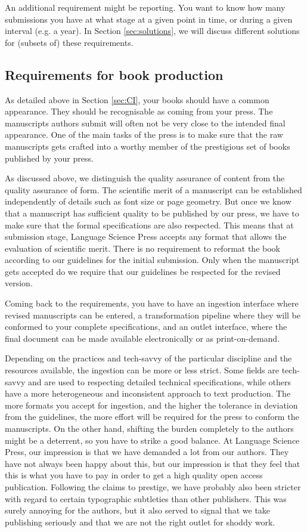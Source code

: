 \documentclass[nonflat,modfonts,output=book] {langsci/langscibook}
\begin{document}
An additional requirement might be reporting. You want to know how many submissions you have at what stage at a given point in time, or during a given interval (e.g. a year). In Section \ref{sec:solutions}, we will discuss different solutions for (subsets of) these requirements. 
 
 
\subsection{Requirements for book production}
As detailed above in Section \ref{sec:CI}, your books should have a common appearance. They should be recognisable as coming from your press. The manuscripts authors submit will often not be very close to the intended final appearance. One of the main tasks of the press is to make sure that the raw manuscripts gets crafted into a worthy member of the prestigious set of books published by your press. 

As discussed above, we distinguish the quality assurance of content from the quality assurance of form. The scientific merit of a manuscript can be established independently of details such as font size or page geometry. But once we know that a manuscript has sufficient quality to be published by our press, we have to make sure that the formal specifications are also respected. This means that at submission stage, Language Science Press accepts any format that allows the evaluation of scientific merit. There is no requirement to reformat the book according to our guidelines for the initial submission. Only when the manuscript gets accepted do we require that our guidelines be respected for the revised version. 

Coming back to the requirements, you have to have an ingestion interface where revised manuscripts can be entered, a transformation pipeline where they will be conformed to your complete specifications, and an outlet interface, where the final document can be made available electronically or as print-on-demand.

Depending on the practices and tech-savvy of the particular discipline and the resources available, the ingestion can be more or less strict. Some fields are tech-savvy and are used to respecting detailed technical specifications, while others have a more heterogeneous and inconsistent approach to text production. The more formats you accept for ingestion, and the higher the tolerance in deviation from the guidelines, the more effort will be required for the press to conform the manuscripts. On the other hand, shifting the burden completely to the authors might be a deterrent, so you have to strike a good balance. At Language Science Press, our impression is that we have demanded a lot from our authors. They have not always been happy about this, but our impression is that they feel that this is what you have to pay in order to get a high quality open access publication. Following the claims to prestige, we have probably also been stricter with regard to certain typographic subtleties than other publishers. This was surely annoying for the authors, but it also served to signal that we take publishing seriously and that we are not the right outlet for shoddy work. 
\end{document}
